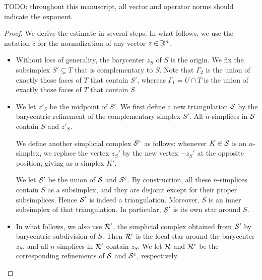 \documentclass[10pt,a4paper]{article}
\newcommand{\mwl}[1]{{\color{red}#1}}
\begin{document}
\mwl{TODO: throughout this manuscript, all vector and operator norms should indicate the exponent.}
\begin{proof}
    We derive the estimate in several steps. 
    In what follows, we use the notation $\hat z$ for the normalization of any vector $z \in {\mathbb R}^{n}$.
    \begin{itemize}
        \item 
        Without loss of generality, the barycenter $z_{S}$ of $S$ is the origin. 
        We fix the subsimplex $S' \subseteq T$ that is complementary to $S$.
        Note that ${\Gamma_2}$ is the union of exactly those faces of $T$ that contain $S'$,
        whereas ${\Gamma_1} = U \cap T$ is the union of exactly those faces of $T$ that contain $S$. 
        
        
        \item 
        We let $z'_{S}$ be the midpoint of $S'$. 
        We first define a new triangulation ${\mathcal S}$ by the barycentric refinement of the complementary simplex $S'$. 
        All $n$-simplices in ${\mathcal S}$ contain $S$ and $z'_{S}$.
        
        We define another simplicial complex ${\mathcal S}^c$ as follows:
        whenever $K \in {\mathcal S}$ is an $n$-simplex, 
        we replace the vertex $z_{S}'$ by the new vertex $-z_{S}'$ at the opposite position,
        giving us a simplex $K'$. 
        
        We let ${\mathcal S}'$ be the union of ${\mathcal S}$ and ${\mathcal S}^c$. 
        By construction, all these $n$-simplices contain $S$ as a subsimplex,
        and they are disjoint except for their proper subsimplices. 
        Hence ${\mathcal S}'$ is indeed a triangulation. 
        Moreover, $S$ is an inner subsimplex of that triangulation. 
        In particular, ${\mathcal S}'$ is its own star around $S$.
        
        
        \item 
        In what follows, we also use ${\mathcal R}'$, 
        the simplicial complex obtained from ${\mathcal S}'$ by barycentric subdivision of $S$.
        Then ${\mathcal R}'$ is the local star around the barycenter $z_S$,
        and all $n$-simplices in ${\mathcal R}'$ contain $z_{S}$. 
        We let ${\mathcal R}$ and ${\mathcal R}^{c}$ be the corresponding refinements of ${\mathcal S}$ and ${\mathcal S}^{c}$, respectively.
        

\end{itemize}
\end{proof}
\end{document}
